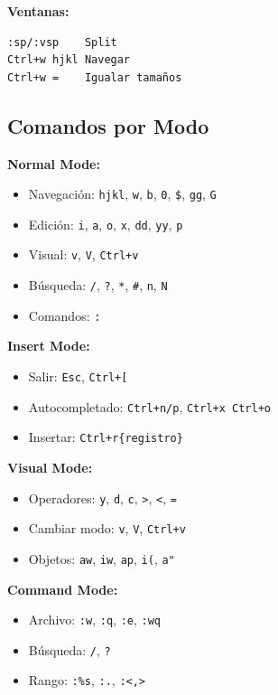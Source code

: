 \documentclass[
  doc,
  floatsintext,
  longtable,
  a4paper,
  nolmodern,
  notxfonts,
  notimes,
  12pt,
  colorlinks=true,linkcolor=blue,citecolor=blue,urlcolor=blue]{apa7}
\providecommand{\tightlist}{%
  \setlength{\itemsep}{0pt}\setlength{\parskip}{0pt}}
\begin{document}
\textbf{Ventanas:}

\begin{verbatim}
:sp/:vsp    Split
Ctrl+w hjkl Navegar
Ctrl+w =    Igualar tamaños
\end{verbatim}

\subsection{Comandos por Modo}\label{comandos-por-modo}

\textbf{Normal Mode:}

\begin{itemize}
\tightlist
\item
  Navegación: \texttt{hjkl}, \texttt{w}, \texttt{b}, \texttt{0},
  \texttt{\$}, \texttt{gg}, \texttt{G}
\item
  Edición: \texttt{i}, \texttt{a}, \texttt{o}, \texttt{x}, \texttt{dd},
  \texttt{yy}, \texttt{p}
\item
  Visual: \texttt{v}, \texttt{V}, \texttt{Ctrl+v}
\item
  Búsqueda: \texttt{/}, \texttt{?}, \texttt{*}, \texttt{\#}, \texttt{n},
  \texttt{N}
\item
  Comandos: \texttt{:}
\end{itemize}

\textbf{Insert Mode:}

\begin{itemize}
\tightlist
\item
  Salir: \texttt{Esc}, \texttt{Ctrl+{[}}
\item
  Autocompletado: \texttt{Ctrl+n/p}, \texttt{Ctrl+x\ Ctrl+o}
\item
  Insertar: \texttt{Ctrl+r\{registro\}}
\end{itemize}

\textbf{Visual Mode:}

\begin{itemize}
\tightlist
\item
  Operadores: \texttt{y}, \texttt{d}, \texttt{c},
  \texttt{\textgreater{}}, \texttt{\textless{}}, \texttt{=}
\item
  Cambiar modo: \texttt{v}, \texttt{V}, \texttt{Ctrl+v}
\item
  Objetos: \texttt{aw}, \texttt{iw}, \texttt{ap}, \texttt{i(},
  \texttt{a"}
\end{itemize}

\textbf{Command Mode:}

\begin{itemize}
\tightlist
\item
  Archivo: \texttt{:w}, \texttt{:q}, \texttt{:e}, \texttt{:wq}
\item
  Búsqueda: \texttt{/}, \texttt{?}
\item
  Rango: \texttt{:\%s}, \texttt{:.},
  \texttt{:\textquotesingle{}\textless{},\textquotesingle{}\textgreater{}}
\end{itemize}
\end{document}
